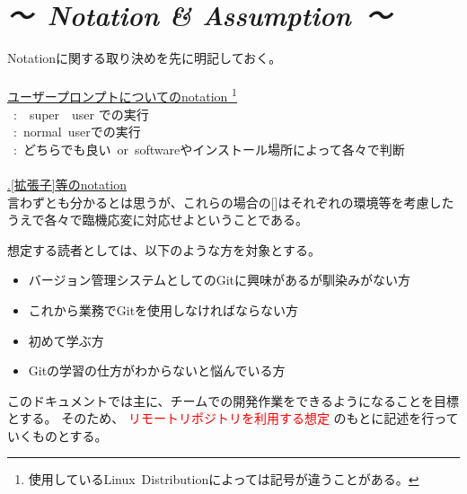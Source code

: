 \documentclass[11pt,a4paper,openany,dvipdfmx]{jsarticle}
\begin{document}
\section*{\it {～\ Notation }\rm{\&}\it{ Assumption\ ～}}
Notationに関する取り決めを先に明記しておく。
\\
\\
\underline{ユーザープロンプトについてのnotation
\footnote{使用しているLinux\ Distributionによっては記号が違うことがある。}
}\\
\ :\ \ super\ \ user での実行\\
\ :\ normal\ userでの実行\\
\ :\ どちらでも良い\ or\ softwareやインストール場所によって各々で判断
\\
\\
\underline{.[拡張子]等のnotation}\\
言わずとも分かるとは思うが、これらの場合の[]はそれぞれの環境等を考慮したうえで各々で臨機応変に対応せよということである。\newline

想定する読者としては、以下のような方を対象とする。
\begin{itemize}
	\item バージョン管理システムとしてのGitに興味があるが馴染みがない方
	\item これから業務でGitを使用しなければならない方
	\item 初めて学ぶ方
	\item Gitの学習の仕方がわからないと悩んでいる方
\end{itemize}


このドキュメントでは主に、チームでの開発作業をできるようになることを目標とする。
そのため、\textcolor{red}{ リモートリポジトリを利用する想定 }のもとに記述を行っていくものとする。



\end{document}
